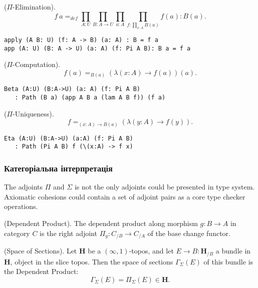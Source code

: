 \begin{definition} ($\Pi$-Elimination).
$$f\ a =_{def} \prod_{A:U}\prod_{B: A \rightarrow U}\prod_{a:A}\prod_{f: \prod_{x:A}B(a)}f(a) : B(a).$$
\begin{lstlisting}
apply (A B: U) (f: A -> B) (a: A) : B = f a
app (A: U) (B: A -> U) (a: A) (f: Pi A B): B a = f a
\end{lstlisting}
\end{definition}

\begin{theorem} ($\Pi$-Computation).
$$f(a) =_{B(a)} (\lambda (x:A) \rightarrow f(a))(a).$$
\begin{lstlisting}
Beta (A:U) (B:A->U) (a: A) (f: Pi A B)
   : Path (B a) (app A B a (lam A B f)) (f a)
\end{lstlisting}
\end{theorem}

\begin{theorem} ($\Pi$-Uniqueness).
$$f =_{(x:A)\rightarrow B(a)} (\lambda (y:A) \rightarrow f(y)).$$
\begin{lstlisting}
Eta (A:U) (B:A->U) (a:A) (f: Pi A B)
   : Path (Pi A B) f (\(x:A) -> f x)
\end{lstlisting}
\end{theorem}

\subsubsection*{Категоріальна інтерпретація}

The adjoints $\Pi$ and $\Sigma$ is not the only adjoints could be presented in type system.
Axiomatic cohesions could contain a set of adjoint pairs as a core type checker operations.

\begin{definition} (Dependent Product).
The dependent product along morphism $g: B \rightarrow A$ in category $C$ is the right
adjoint $\Pi_g : C_{/B} \rightarrow C_{/A}$ of the base change functor.
\end{definition}

\begin{definition} (Space of Sections).
Let $\mathbf{H}$ be a $(\infty,1)$-topos, and let $E \rightarrow B : \mathbf{H}_{/B}$ a bundle in
$\mathbf{H}$, object in the slice topos. Then the space of sections $\Gamma_\Sigma(E)$
of this bundle is the Dependent Product:
$$ \Gamma_\Sigma(E) = \Pi_\Sigma (E) \in \mathbf{H}. $$
\end{definition}


